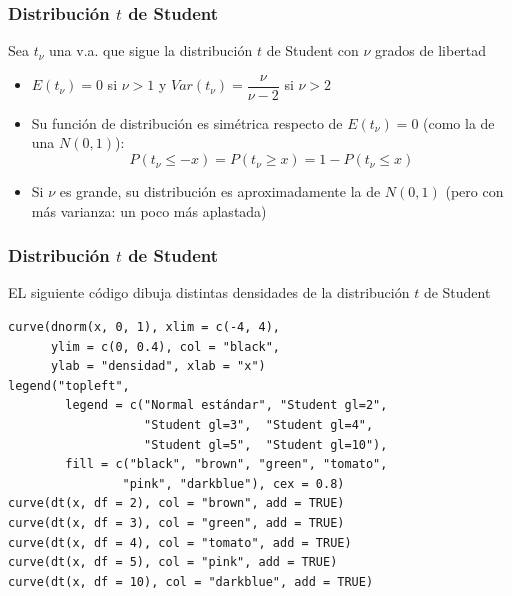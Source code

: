 \documentclass[12pt,t]{beamer}\usepackage[]{graphicx}\usepackage[]{color}
\renewcommand{\leq}{\leqslant}
\renewcommand{\geq}{\geqslant}
\theoremstyle{plain}
\theoremstyle{definition}
\begin{document}
\begin{frame}
\frametitle{Distribución $t$ de Student}

Sea $t_{\nu}$ una v.a. que sigue la distribución $t$ de
Student con $\nu$ grados de libertad
\medskip

\begin{itemize}
\item $E(t_{\nu})=0$  si $\nu>1$ y $Var(t_{\nu})=\dfrac{\nu}{\nu-2}$ si $\nu>2$
\medskip

\item Su  función de distribución es simétrica respecto de $E(t_{\nu})=0$ (como la de una $N(0,1)$):
$$
P(t_{\nu}\leq -x)=P(t_{\nu}\geq x)=1-P(t_{\nu}\leq x)
$$

\item Si $\nu$ es grande, su distribución es aproximadamente la de $N(0,1)$ (pero con más varianza: un poco más aplastada)
\end{itemize}

\end{frame}

\begin{frame}[fragile]
\frametitle{Distribución $t$ de Student}

EL siguiente código dibuja distintas densidades de la distribución $t$ de Student
{\small
\begin{verbatim}
curve(dnorm(x, 0, 1), xlim = c(-4, 4),
      ylim = c(0, 0.4), col = "black",
      ylab = "densidad", xlab = "x")
legend("topleft",  
        legend = c("Normal estándar", "Student gl=2",
                   "Student gl=3",  "Student gl=4", 
                   "Student gl=5",  "Student gl=10"),
        fill = c("black", "brown", "green", "tomato",
                "pink", "darkblue"), cex = 0.8)
curve(dt(x, df = 2), col = "brown", add = TRUE)
curve(dt(x, df = 3), col = "green", add = TRUE)
curve(dt(x, df = 4), col = "tomato", add = TRUE)
curve(dt(x, df = 5), col = "pink", add = TRUE)
curve(dt(x, df = 10), col = "darkblue", add = TRUE)
\end{verbatim}
}
\end{frame}
\end{document}
